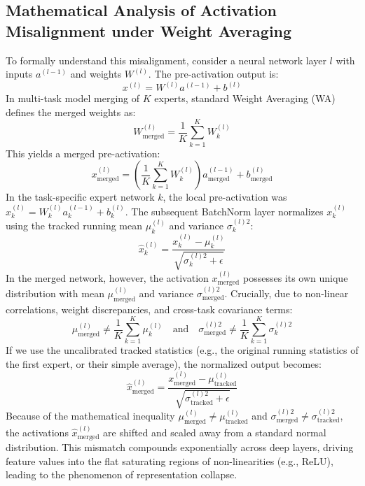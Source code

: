 \documentclass{article}
\begin{document}
\subsection{Mathematical Analysis of Activation Misalignment under Weight Averaging}
To formally understand this misalignment, consider a neural network layer $l$ with inputs $a^{(l-1)}$ and weights $W^{(l)}$. The pre-activation output is:
\begin{equation}
x^{(l)} = W^{(l)} a^{(l-1)} + b^{(l)}
\end{equation}
In multi-task model merging of $K$ experts, standard Weight Averaging (WA) defines the merged weights as:
\begin{equation}
W_{\text{merged}}^{(l)} = \frac{1}{K} \sum_{k=1}^K W_k^{(l)}
\end{equation}
This yields a merged pre-activation:
\begin{equation}
x_{\text{merged}}^{(l)} = \left(\frac{1}{K} \sum_{k=1}^K W_k^{(l)}\right) a_{\text{merged}}^{(l-1)} + b_{\text{merged}}^{(l)}
\end{equation}
In the task-specific expert network $k$, the local pre-activation was $x_k^{(l)} = W_k^{(l)} a_k^{(l-1)} + b_k^{(l)}$. The subsequent BatchNorm layer normalizes $x_k^{(l)}$ using the tracked running mean $\mu_k^{(l)}$ and variance $\sigma_k^{(l)2}$:
\begin{equation}
\hat{x}_k^{(l)} = \frac{x_k^{(l)} - \mu_k^{(l)}}{\sqrt{\sigma_k^{(l)2} + \epsilon}}
\end{equation}
In the merged network, however, the activation $x_{\text{merged}}^{(l)}$ possesses its own unique distribution with mean $\mu_{\text{merged}}^{(l)}$ and variance $\sigma_{\text{merged}}^{(l)2}$. Crucially, due to non-linear correlations, weight discrepancies, and cross-task covariance terms:
\begin{equation}
\mu_{\text{merged}}^{(l)} \neq \frac{1}{K} \sum_{k=1}^K \mu_k^{(l)} \quad \text{and} \quad \sigma_{\text{merged}}^{(l)2} \neq \frac{1}{K} \sum_{k=1}^K \sigma_k^{(l)2}
\end{equation}
If we use the uncalibrated tracked statistics (e.g., the original running statistics of the first expert, or their simple average), the normalized output becomes:
\begin{equation}
\hat{x}_{\text{merged}}^{(l)} = \frac{x_{\text{merged}}^{(l)} - \mu_{\text{tracked}}^{(l)}}{\sqrt{\sigma_{\text{tracked}}^{(l)2} + \epsilon}}
\end{equation}
Because of the mathematical inequality $\mu_{\text{merged}}^{(l)} \neq \mu_{\text{tracked}}^{(l)}$ and $\sigma_{\text{merged}}^{(l)2} \neq \sigma_{\text{tracked}}^{(l)2}$, the activations $\hat{x}_{\text{merged}}^{(l)}$ are shifted and scaled away from a standard normal distribution. This mismatch compounds exponentially across deep layers, driving feature values into the flat saturating regions of non-linearities (e.g., ReLU), leading to the phenomenon of representation collapse.
\end{document}
